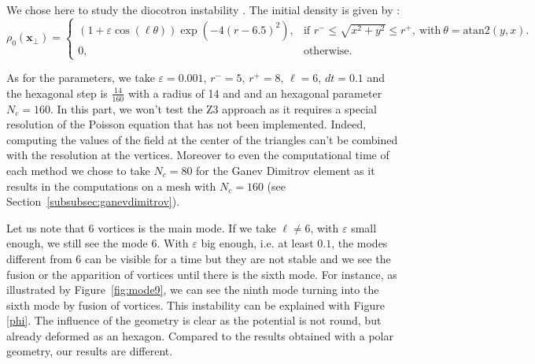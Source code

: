 \documentclass[proc]{edpsmath}
\begin{document}
We chose here to study the diocotron instability \cite{madaule:hal-00841504}.
The initial density is given by :
\begin{equation*}
 \rho_0(\mathbf{x}_\bot)=
 \left\{
 \begin{array}{ll}
  (1+\varepsilon\cos(\ell\theta))\exp{(-4(r-6.5)^2)},&\text{if  } r^-\leq\sqrt{x^2+y^2}\leq r^+,~ \text{with} ~\theta=\text{atan2}(y,x).\\[3mm]
  0,&\text{otherwise}.
 \end{array}
 \right.
\end{equation*}

\noindent As for the parameters, we take $\varepsilon=0.001$, $r^-=5$, $r^+=8$, $\ell=6$, $dt=0.1$ and the hexagonal step is $\frac{14}{160}$ with a radius of 14 and and an hexagonal parameter $N_c =160$.
In this part, we won't test the Z3 approach as it requires a special resolution of the Poisson equation that has not been implemented. Indeed, computing the values of the field at the center of the triangles can't be combined with the resolution at the vertices. 
Moreover to even the computational time of each method we chose to take $N_c=80$ for the Ganev Dimitrov element as it results in the computations on a mesh with $N_c =160$ (see Section~\ref{subsubsec:ganevdimitrov}).

Let us note that 6 vortices is the main mode. If we take $\ell\neq6$, with $\varepsilon$ small enough, we still see the mode 6. With $\varepsilon$ big enough, i.e. at least $0.1$, the modes different from 6 can be visible for a time but they are not stable and we see the fusion or the apparition of vortices until there is the sixth mode. For instance, as illustrated by Figure~\ref{fig:mode9}, we can see the ninth mode turning into the sixth mode by fusion of vortices. This instability can be explained with Figure \ref{phi}. The influence of the geometry is clear as the potential is not round, but already deformed as an hexagon. Compared to the results obtained with a polar geometry, our results are different. 
\end{document}

